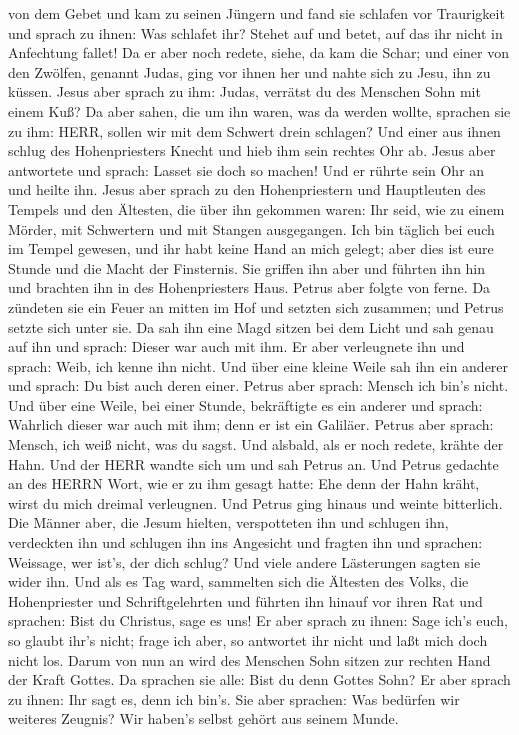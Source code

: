 von dem Gebet und kam zu seinen Jüngern und fand sie schlafen vor
Traurigkeit  und sprach zu ihnen: Was schlafet ihr? Stehet
auf und betet, auf das ihr nicht in Anfechtung fallet!  Da
er aber noch redete, siehe, da kam die Schar; und einer von den Zwölfen,
genannt Judas, ging vor ihnen her und nahte sich zu Jesu, ihn zu küssen.
 Jesus aber sprach zu ihm: Judas, verrätst du des Menschen
Sohn mit einem Kuß?  Da aber sahen, die um ihn waren, was
da werden wollte, sprachen sie zu ihm: HERR, sollen wir mit dem Schwert
drein schlagen?  Und einer aus ihnen schlug des
Hohenpriesters Knecht und hieb ihm sein rechtes Ohr ab. 
Jesus aber antwortete und sprach: Lasset sie doch so machen! Und er
rührte sein Ohr an und heilte ihn.  Jesus aber sprach zu
den Hohenpriestern und Hauptleuten des Tempels und den Ältesten, die
über ihn gekommen waren: Ihr seid, wie zu einem Mörder, mit Schwertern
und mit Stangen ausgegangen.  Ich bin täglich bei euch im
Tempel gewesen, und ihr habt keine Hand an mich gelegt; aber dies ist
eure Stunde und die Macht der Finsternis.  Sie griffen ihn
aber und führten ihn hin und brachten ihn in des Hohenpriesters Haus.
Petrus aber folgte von ferne.  Da zündeten sie ein Feuer an
mitten im Hof und setzten sich zusammen; und Petrus setzte sich unter
sie.  Da sah ihn eine Magd sitzen bei dem Licht und sah
genau auf ihn und sprach: Dieser war auch mit ihm.  Er aber
verleugnete ihn und sprach: Weib, ich kenne ihn nicht.  Und
über eine kleine Weile sah ihn ein anderer und sprach: Du bist auch
deren einer. Petrus aber sprach: Mensch ich bin's nicht. 
Und über eine Weile, bei einer Stunde, bekräftigte es ein anderer und
sprach: Wahrlich dieser war auch mit ihm; denn er ist ein Galiläer.
 Petrus aber sprach: Mensch, ich weiß nicht, was du sagst.
Und alsbald, als er noch redete, krähte der Hahn.  Und der
HERR wandte sich um und sah Petrus an. Und Petrus gedachte an des HERRN
Wort, wie er zu ihm gesagt hatte: Ehe denn der Hahn kräht, wirst du mich
dreimal verleugnen.  Und Petrus ging hinaus und weinte
bitterlich.  Die Männer aber, die Jesum hielten,
verspotteten ihn und schlugen ihn,  verdeckten ihn und
schlugen ihn ins Angesicht und fragten ihn und sprachen: Weissage, wer
ist's, der dich schlug?  Und viele andere Lästerungen
sagten sie wider ihn.  Und als es Tag ward, sammelten sich
die Ältesten des Volks, die Hohenpriester und Schriftgelehrten und
führten ihn hinauf vor ihren Rat  und sprachen: Bist du
Christus, sage es uns! Er aber sprach zu ihnen: Sage ich's euch, so
glaubt ihr's nicht;  frage ich aber, so antwortet ihr nicht
und laßt mich doch nicht los.  Darum von nun an wird des
Menschen Sohn sitzen zur rechten Hand der Kraft Gottes.  Da
sprachen sie alle: Bist du denn Gottes Sohn? Er aber sprach zu ihnen:
Ihr sagt es, denn ich bin's.  Sie aber sprachen: Was
bedürfen wir weiteres Zeugnis? Wir haben's selbst gehört aus seinem
Munde.

